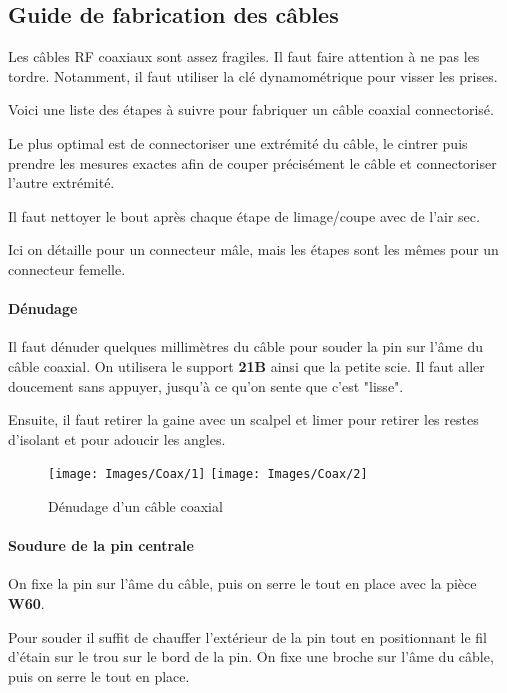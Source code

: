 \subsection{Guide de fabrication des câbles}
Les câbles RF coaxiaux sont assez fragiles. Il faut faire attention à ne pas les tordre. Notamment, il faut utiliser la clé dynamométrique pour visser les prises.\newline 

Voici une liste des étapes à suivre pour fabriquer un câble coaxial connectorisé.

Le plus optimal est de connectoriser une extrémité du câble, le cintrer puis prendre les mesures exactes afin de couper précisément le câble et connectoriser l'autre extrémité.

Il faut nettoyer le bout après chaque étape de limage/coupe avec de l'air sec.

Ici on détaille pour un connecteur mâle, mais les étapes sont les mêmes pour un connecteur femelle.

\paragraph*{Dénudage}Il faut dénuder quelques millimètres du câble pour souder la pin sur l’âme du câble coaxial. On utilisera le support \textbf{21B} ainsi que la petite scie. Il faut aller doucement sans appuyer, jusqu'à ce qu'on sente que c'est "lisse".

Ensuite, il faut retirer la gaine avec un scalpel et limer pour retirer les restes d'isolant et pour adoucir les angles.
\begin{figure}[h]
    \begin{center}
        \texttt{[image: Images/Coax/1]}
        \quad
        \texttt{[image: Images/Coax/2]}
        \caption{Dénudage d'un câble coaxial}
        \label{coax_denudage}
    \end{center}
\end{figure}


\paragraph*{Soudure de la pin centrale} 
On fixe la pin sur l'âme du câble, puis on serre le tout en place avec la pièce \textbf{W60}.
     
Pour souder il suffit de chauffer l'extérieur de la pin tout en positionnant le fil d'étain sur le trou sur le bord de la pin.
On fixe une broche sur l’âme du câble, puis on serre le tout en place.

